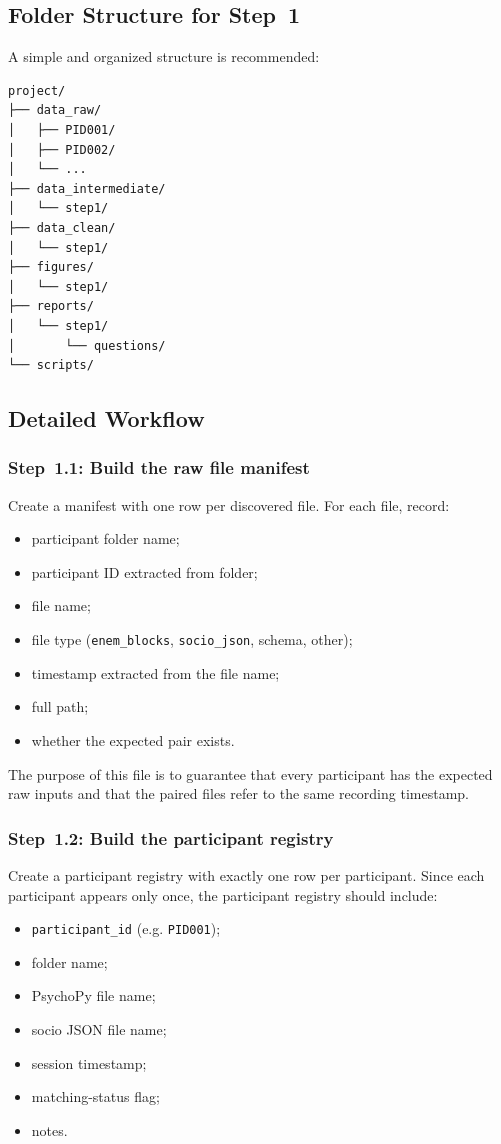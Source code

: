 \subsection{Folder Structure for Step~1}
A simple and organized structure is recommended:
\begin{verbatim}
project/
├── data_raw/
│   ├── PID001/
│   ├── PID002/
│   └── ...
├── data_intermediate/
│   └── step1/
├── data_clean/
│   └── step1/
├── figures/
│   └── step1/
├── reports/
│   └── step1/
│       └── questions/
└── scripts/
\end{verbatim}

\subsection{Detailed Workflow}

\subsubsection{Step~1.1: Build the raw file manifest}
Create a manifest with one row per discovered file.
For each file, record:
\begin{itemize}
    \item participant folder name;
    \item participant ID extracted from folder;
    \item file name;
    \item file type (\texttt{enem\_blocks}, \texttt{socio\_json}, schema, other);
    \item timestamp extracted from the file name;
    \item full path;
    \item whether the expected pair exists.
\end{itemize}

The purpose of this file is to guarantee that every participant has the expected raw inputs and that
the paired files refer to the same recording timestamp.

\subsubsection{Step~1.2: Build the participant registry}
Create a participant registry with exactly one row per participant.
Since each participant appears only once, the participant registry should include:
\begin{itemize}
    \item \texttt{participant\_id} (e.g. \texttt{PID001});
    \item folder name;
    \item PsychoPy file name;
    \item socio JSON file name;
    \item session timestamp;
    \item matching-status flag;
    \item notes.
\end{itemize}

